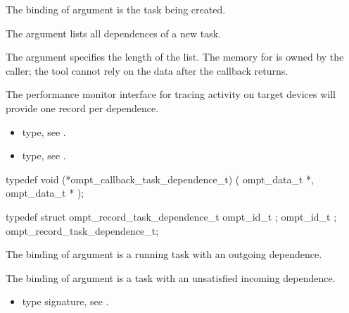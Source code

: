 \argdesc

The binding of argument  is the task being created.

The argument  lists all dependences of a new task.

The argument  specifies the length of the list.
The memory for  is owned by the caller; the tool cannot rely on
the data after the callback returns.

The performance monitor interface for tracing activity on target devices will provide one record per dependence.

\crossreferences
\begin{itemize}
\item {} type, see
.
\item {} type, see
.
\end{itemize}



\label{sec:ompt_callback_task_dependence_t}
\format

\begin{ccppspecific}
\begin{omptCallback}
typedef void (*ompt_callback_task_dependence_t) (
  ompt_data_t *,
  ompt_data_t *
);
\end{omptCallback}
\end{ccppspecific}


\record

\begin{ccppspecific}
\begin{omptRecord}
typedef struct ompt_record_task_dependence_t {
  ompt_id_t ;
  ompt_id_t ;
} ompt_record_task_dependence_t;
\end{omptRecord}
\end{ccppspecific}


\argdesc

The binding of argument  is a running task
with an outgoing dependence.

The binding of argument  is a task with an
unsatisfied incoming dependence.


\crossreferences
\begin{itemize}
\item {} type signature, see
.
\end{itemize}



